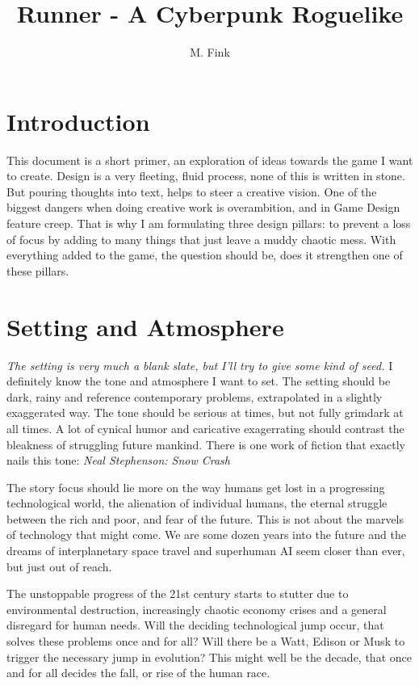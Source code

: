 \documentclass[11pt,a4paper]{article}
\begin{document}
\title{Runner - A Cyberpunk Roguelike}
\author{M. Fink}

\maketitle


\section{Introduction}
This document is a short primer, an exploration of ideas towards the game I want to create.
Design is a very fleeting, fluid process, none of this is written in stone. But pouring
thoughts into text, helps to steer a creative vision.
One of the biggest dangers when doing creative work is overambition, and in Game Design
feature creep. That is why I am formulating three design pillars: to prevent a loss of
focus by adding to many things that just leave a muddy chaotic mess. With everything added
to the game, the question should be, does it strengthen one of these pillars.

\section{Setting and Atmosphere}
\textit{The setting is very much a blank slate, but I'll try to give some kind of seed.}
I definitely know the tone and atmosphere I want to set. The setting should be dark,
rainy and reference contemporary problems, extrapolated in a slightly exaggerated way.
The tone should be serious at times, but not fully grimdark at all times. A lot of
cynical humor and caricative exagerrating should contrast the bleakness of struggling
future mankind. There is one work of fiction that exactly nails this tone:
\textit{Neal Stephenson: Snow Crash}

The story focus should lie more on the way humans get lost in a progressing technological
world, the alienation of individual humans, the eternal struggle between the rich and
poor, and fear of the future. This is not about the marvels of technology that might come.
We are some dozen years into the future and the dreams of interplanetary space travel
and superhuman AI seem closer than ever, but just out of reach.

The unstoppable progress of the 21st century starts to stutter due to environmental
destruction, increasingly chaotic economy crises and a general disregard for human
needs. Will the deciding technological jump occur, that solves these problems once and
for all? Will there be a Watt, Edison or Musk to trigger the necessary jump in evolution?
This might well be the decade, that once and for all decides the fall, or rise of the
human race.
\end{document}

